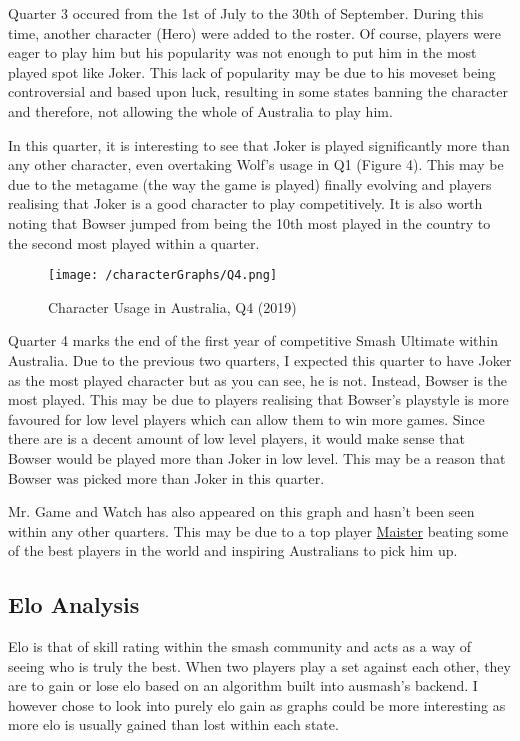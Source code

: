 \documentclass[11pt, oneside, a4paper]{article}
\begin{document}
Quarter 3 occured from the 1st of July to the 30th of September. During this time, another character (Hero) were added to the roster. Of course, players were eager to play him but his popularity was not enough to put him in the most played spot like Joker. This lack of popularity may be due to his moveset being controversial and based upon luck, resulting in some states banning the character and therefore, not allowing the whole of Australia to play him.

In this quarter, it is interesting to see that Joker is played significantly more than any other character, even overtaking Wolf's usage in Q1 (Figure 4). This may be due to the metagame (the way the game is played) finally evolving and players realising that Joker is a good character to play competitively. It is also worth noting that Bowser jumped from being the 10th most played in the country to the second most played within a quarter. 

\newpage
\begin{figure}[!ht]
	\centerline{\texttt{[image: /characterGraphs/Q4.png]}}
	\caption{Character Usage in Australia, Q4 (2019)}
	\label{fig:figure2}
\end{figure}

Quarter 4 marks the end of the first year of competitive Smash Ultimate within Australia. Due to the previous two quarters, I expected this quarter to have Joker as the most played character but as you can see, he is not. Instead, Bowser is the most played. This may be due to players realising that Bowser's playstyle is more favoured for low level players which can allow them to win more games. Since there are is a decent amount of low level players, it would make sense that Bowser would be played more than Joker in low level. This may be a reason that Bowser was picked more than Joker in this quarter.

Mr. Game and Watch has also appeared on this graph and hasn't been seen within any other quarters. This may be due to a top player \href{https://liquipedia.net/smash/Maister}{Maister} beating some of the best players in the world and inspiring Australians to pick him up.

\newpage
\subsection{Elo Analysis}
Elo is that of skill rating within the smash community and acts as a way of seeing who is truly the best. When two players play a set against each other, they are to gain or lose elo based on an algorithm built into ausmash's backend. I however chose to look into purely elo gain as graphs could be more interesting as more elo is usually gained than lost within each state. 
\end{document}
